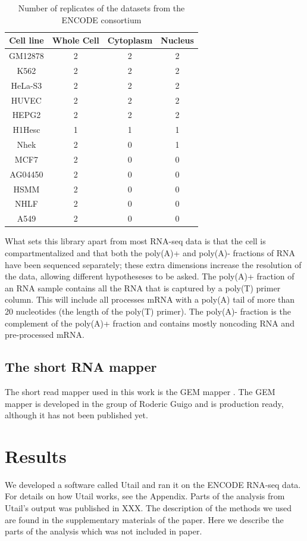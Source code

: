 \begin{table}
	\centering
	\begin{tabular}{cccc}
	  Cell line & Whole Cell & Cytoplasm & Nucleus \\
	  \midrule
	  GM12878 & 2 & 2 & 2 \\
	  K562 & 2 & 2 & 2 \\
	  HeLa-S3 & 2 & 2 & 2 \\
	  HUVEC & 2 & 2 & 2 \\
	  HEPG2 & 2 & 2 & 2 \\
	  H1Hesc & 1 & 1 & 1 \\
	  Nhek & 2 & 0 & 1 \\
	  MCF7 & 2 & 0 & 0 \\
	  AG04450 & 2 & 0 & 0 \\
	  HSMM & 2 & 0 & 0 \\
	  NHLF & 2 & 0 & 0 \\
	  A549 & 2 & 0 & 0 \\
	\end{tabular}
	\caption{Number of replicates of the datasets from the ENCODE consortium}
	\label{tab:Datasets}
\end{table}

What sets this library apart from most RNA-seq data is that the cell is
compartmentalized and that both the poly(A)+ and poly(A)- fractions of RNA have
been sequenced separately; these extra dimensions increase the resolution of
the data, allowing different hypotheseses to be asked. The poly(A)+ fraction of
an RNA sample contains all the RNA that is captured by a poly(T) primer column.
This will include all processes mRNA with a poly(A) tail of more than 20
nucleotides (the length of the poly(T) primer). The poly(A)- fraction is the
complement of the poly(A)+ fraction and contains mostly noncoding RNA and
pre-processed mRNA.

\subsection{The short RNA mapper}
The short read mapper used in this work is the GEM mapper
\cite{ribeca_gem_2010}. The GEM mapper is developed in the group of Roderic
Guigo and is production ready, although it has not been published yet.

\section{Results}
We developed a software called Utail and ran it on the ENCODE RNA-seq data.
For details on how Utail works, see the Appendix. Parts of the analysis from
Utail's output was published in XXX. The description of the methods we used are
found in the supplementary materials of the paper. Here we describe the parts
of the analysis which was not included in paper.

